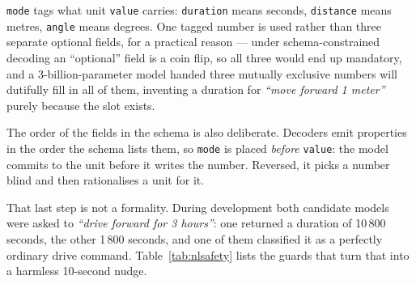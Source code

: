\documentclass[11pt,a4paper]{article}
\newcommand{\code}[1]{\texttt{#1}}
\begin{document}
\code{mode} tags what unit \code{value} carries: \code{duration} means seconds,
\code{distance} means metres, \code{angle} means degrees. One tagged number is
used rather than three separate optional fields, for a practical reason ---
under schema-constrained decoding an ``optional'' field is a coin flip, so all
three would end up mandatory, and a 3-billion-parameter model handed three
mutually exclusive numbers will dutifully fill in all of them, inventing a
duration for \emph{``move forward 1 meter''} purely because the slot exists.

The order of the fields in the schema is also deliberate. Decoders emit
properties in the order the schema lists them, so \code{mode} is placed
\emph{before} \code{value}: the model commits to the unit before it writes the
number. Reversed, it picks a number blind and then rationalises a unit for it.

That last step is not a formality. During development both candidate models were
asked to \emph{``drive forward for 3 hours''}: one returned a duration of
10\,800 seconds, the other 1\,800 seconds, and one of them classified it as a
perfectly ordinary drive command. Table~\ref{tab:nlsafety} lists the guards that
turn that into a harmless 10-second nudge.
\end{document}
